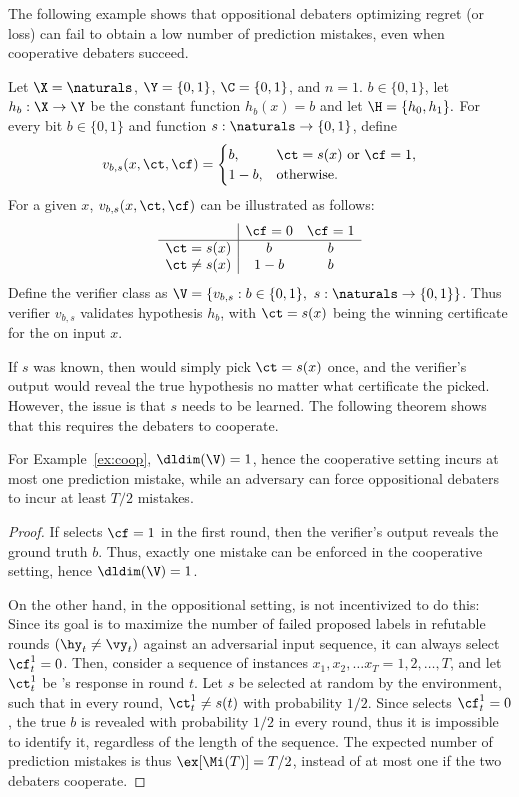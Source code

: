 The following example shows that oppositional debaters optimizing regret (or loss) can fail to obtain a low number of prediction mistakes, even when cooperative debaters succeed. 



\begin{example}\label{ex:coop}
Let $\X=\naturals$, $\Y=\{0,1\}$, $\C=\{0,1\}$, and $n=1$.  $b\in\{0,1\}$, let $h_b:\X\to\Y$ be the constant function $h_b(x)=b$ and let $\H=\{h_0,h_1\}.$
For every bit $b\in\{0,1\}$ and function $s:\naturals\to\{0,1\}$, define
\[
v_{b,s}(x,\ct,\cf)=
\begin{cases}
b, & \ct=s(x)\text{ or }\cf=1,\\
1-b, & \text{otherwise}.
\end{cases}
\]
For a given $x$, $v_{b,s}(x,\ct,\cf)$ can be illustrated as follows:
\[
\begin{array}{c|cc}
 & \cf=0 & \cf=1\\
\hline
\ct=s(x) & b & b\\
\ct\neq s(x) & 1-b & b
\end{array}
\]
Define the verifier class as $\V=\{v_{b,s}:b\in\{0,1\},\ s:\naturals\to\{0,1\}\}$. Thus verifier $v_{b,s}$ validates hypothesis $h_b$, with $\ct=s(x)$ being the winning certificate for the \dt on input $x$. 
\end{example}
If $s$ was known, then \dt would simply pick $\ct=s(x)$ once, and the verifier's output would reveal the true hypothesis no matter what certificate the \df picked. However, the issue is that $s$ needs to be learned. The following theorem shows that this requires the debaters to cooperate.

\begin{theorem}
    For Example~\ref{ex:coop}, $\dldim(\V) = 1$, hence the cooperative setting incurs at most one prediction mistake, while an adversary can force oppositional debaters to incur at least $T/2$ mistakes.
\end{theorem}
\begin{proof}
If \df selects $\cf=1$ in the first round, then the verifier's output reveals the ground truth $b$. Thus, exactly one mistake can be enforced in the cooperative setting, hence $\dldim(\V) = 1$.

On the other hand, in the oppositional setting, \df is not incentivized to do this: 
Since its goal is to maximize the number of failed proposed labels in refutable rounds $(\hy_t \neq \vy_t)$ against an adversarial input sequence, it can always select $\cf^1_t=0$. 
Then, consider a sequence of instances $x_1,x_2,\ldots x_T = 1,2,\ldots, T$, and let $\ct^1_t$ be \dt's response in round $t$. Let $s$ be selected at random by the environment, such that in every round, $\ct^1_t \neq s(t)$ with probability $1/2$. Since \df selects $\cf^1_t = 0$, the true $b$ is revealed with probability $1/2$ in every round, thus it is impossible to identify it, regardless of the length of the sequence. The expected number of prediction mistakes is thus  $\ex[\Mi(T)] = T/2$, instead of at most one if the two debaters cooperate. 
\end{proof}



